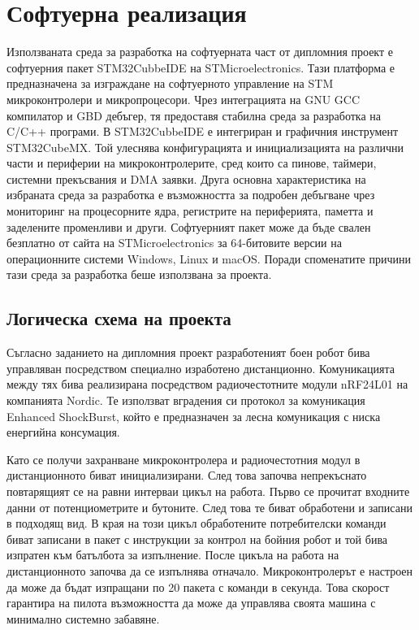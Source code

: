 \chapter{Софтуерна реализация}
\label{chap:software}
Използваната среда за разработка на софтуерната част от дипломния проект е софтуерния пакет STM32CubbeIDE на STMicroelectronics. Тази платформа е предназначена за изграждане на софтуерното управление на STM микроконтролери и микропроцесори. Чрез интеграцията на GNU GCC компилатор и GBD дебъгер, тя предоставя стабилна среда за разработка на C/C++ програми. В STM32CubbeIDE е интегриран и графичния инструмент STM32CubeMX. Той улеснява конфигурацията и инициализацията на различни части и периферии на микроконтролерите, сред които са пинове, таймери, системни прекъсвания и DMA заявки. Друга основна характеристика на избраната среда за разработка е възможността за подробен дебъгване чрез мониторинг на процесорните ядра, регистрите на периферията, паметта и заделените променливи и други. Софтуерният пакет може да бъде свален безплатно от сайта на STMicroelectronics за 64-битовите версии на операционните системи Windows, Linux и macOS. Поради споменатите причини тази среда за разработка беше използвана за проекта.



\section{Логическа схема на проекта}
\label{sec:logic-schemas}

Съгласно заданието на дипломния проект разработеният боен робот бива управляван посредством специално изработено дистанционно. Комуникацията между тях бива реализирана посредством радиочестотните модули nRF24L01 на компанията Nordic. Те използват вградения си протокол за комуникация Enhanced ShockBurst, който е предназначен за лесна комуникация с ниска енергийна консумация.

Като се получи захранване микроконтролера и радиочестотния модул в дистанционното биват инициализирани. След това започва непрекъснато повтарящият се на равни интерваи цикъл на работа. Първо се прочитат входните данни от потенциометрите и бутоните. След това те биват обработени и записани в подходящ вид. В края на този цикъл обработените потребителски команди биват записани в пакет с инструкции за контрол на бойния робот и той бива изпратен към батълбота за изпълнение. После цикъла на работа на дистанционното започва да се изпълнява отначало. Микроконтролерът е настроен да може да бъдат изпращани по 20 пакета с команди в секунда. Това скорост гарантира на пилота възможността да може да управлява своята машина с минимално системно забавяне.

